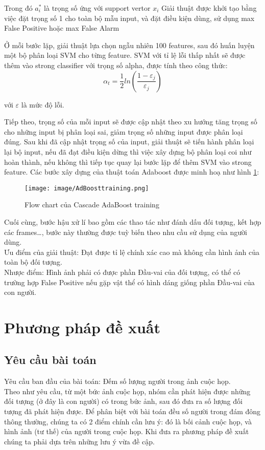 \documentclass[12pt,a4paper]{article}
\begin{document}
Trong đó $a^{*}_i$ là trọng số ứng với support vertor $x_i$
Giải thuật được khởi tạo bằng việc đặt trọng số 1 cho toàn bộ mẫu input, và đặt điều kiện dùng, sử dụng max False Positive hoặc max False Alarm

Ở mỗi bước lặp, giải thuật lựa chọn ngẫu nhiên 100 features, sau đó huấn luyện một bộ phân loại SVM cho từng feature. SVM với tỉ lệ lỗi thấp nhất sẽ được thêm vào strong classifier với trọng số alpha, được tính theo công thức:
\begin{equation}
    \alpha_t = \frac{1}{2}ln(\frac{1-\varepsilon_j}{\varepsilon_j})
\end{equation}

với $\varepsilon$ là mức độ lỗi.

Tiếp theo, trọng số của mỗi input sẽ được cập nhật theo xu hướng tăng trọng số cho những input bị phân loại sai, giảm trọng số những input được phân loại đúng. Sau khi đã cập nhật trọng số của input, giải thuật sẽ tiến hành phân loại lại bộ input, nếu đã đạt điều kiện dừng thì việc xây dựng bộ phân loại coi như hoàn thành, nếu không thì tiếp tục quay lại bước lặp để thêm SVM vào strong feature.
Các bước xây dựng của thuật toán Adaboost được minh hoạ như hình \ref{fig:Cascade AdaBoost}:

\begin{figure}[H]
    \centering
    \texttt{[image: image/AdBoosttraining.png]}
    \caption{Flow chart của Cascade AdaBoost training \cite{Head-shoulder}}
    \label{fig:Cascade AdaBoost}
\end{figure}
Cuối cùng, bước hậu xử lí bao gồm các thao tác như đánh dấu đối tượng, kết hợp các frames…, bước này thường được tuỳ biến theo nhu cầu sử dụng của người dùng.\\
Ưu điểm của giải thuật: Đạt được tỉ lệ chính xác cao mà không cần hình ảnh của toàn bộ đối tượng.\\
Nhược điểm: Hình ảnh phải có được phần Đầu-vai của đối tượng, có thể có trường hợp False Positive nếu gặp vật thể có hình dáng giống phần Đầu-vai của con người.
		\section{Phương pháp đề xuất}
		\subsection{Yêu cầu bài toán}
		 Yêu cầu ban đầu của bài toán: Đếm số lượng người trong ảnh cuộc họp. \\
		 Theo như yêu cầu, từ một bức ảnh cuộc họp, nhóm cần phát hiện được những đối tượng (ở đây là con người) có trong bức ảnh, sau đó đưa ra số lượng đối tượng đã phát hiện được. Để phân biệt với bài toán đều số người trong đám đông thông thường, chúng ta có 2 điểm chính cần lưu ý: đó là bối cảnh cuộc họp, và hình ảnh (tư thế) của người trong cuộc họp. Khi đưa ra phương pháp đề xuất chúng ta phải dựa trên những lưu ý vừa đề cập.
\end{document}
